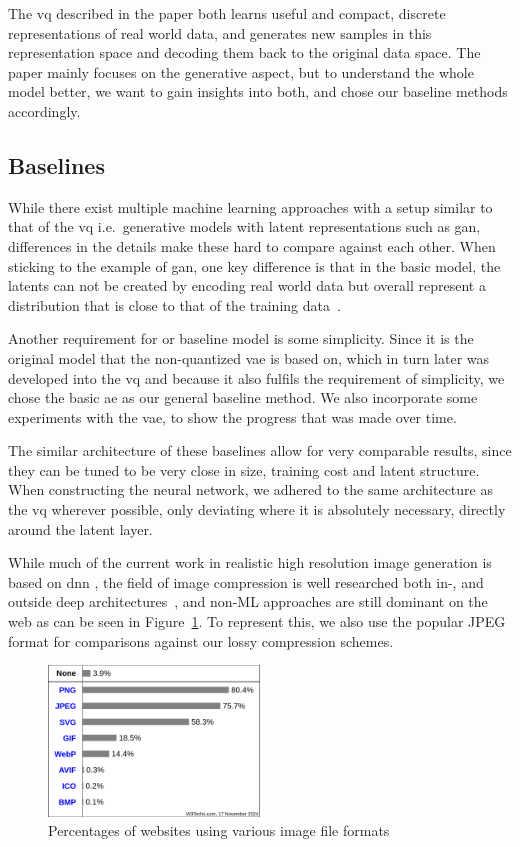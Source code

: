 The \ac{vq} described in the paper both learns useful and compact, discrete representations of real world data,
and generates new samples in this representation space and decoding them back to the original data space.
The paper mainly focuses on the generative aspect, but to understand the whole model better, we want to gain insights
into both, and chose our baseline methods accordingly.

\subsection{Baselines}\label{subsec:baselines}
While there exist multiple machine learning approaches with a setup similar to that of the \ac{vq}
i.e.\ generative models with latent representations such as \ac{gan}, differences in the details make these hard to
compare against each other.
When sticking to the example of \ac{gan}, one key difference is that in the basic model, the latents can not be created
by encoding real world data but overall represent a distribution that is close to that of the training data~\cite{gan}.

Another requirement for or baseline model is some simplicity.
Since it is the original model that the non-quantized \ac{vae} is based on, which in turn later was developed into the
\ac{vq} and because it also fulfils the requirement of simplicity, we chose the basic \ac{ae} as our general baseline
method.
We also incorporate some experiments with the \ac{vae}, to show the progress that was made over time.

The similar architecture of these baselines allow for very comparable results, since they can be tuned to be very
close in size, training cost and latent structure.
When constructing the neural network, we adhered to the same architecture as the \ac{vq} wherever possible,
only deviating where it is absolutely necessary, directly around the latent layer.


While much of the current work in realistic high resolution image generation is based on \ac{dnn} \cite{citationNeeded},
the field of image compression is well researched both in-, and outside deep architectures~\cite{compression},
and non-ML approaches are still dominant on the web as can be seen in Figure~\ref{fig:file_formats}.
To represent this, we also use the popular JPEG format for comparisons against our lossy compression schemes.

\begin{figure}[H]
    \centering
    \includegraphics[width=0.5\textwidth]{images/formats}
    \caption{Percentages of websites using various image file formats~\cite{img_file_format}}
    \label{fig:file_formats}
\end{figure}


